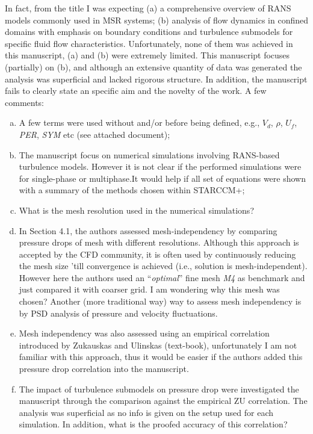 \documentclass[14pt,twoside]{report}
\begin{document}
In fact, from the title I was expecting (a) a comprehensive overview of RANS models commonly used in MSR systems; (b) analysis of flow dynamics in confined domains with emphasis on boundary conditions and turbulence submodels for specific fluid flow characteristics. Unfortunately, none of them was achieved in this manuscript, (a) and (b) were extremely limited. This manuscript focuses (partially) on (b), and although an extensive quantity of data was generated the analysis was superficial and lacked rigorous structure. In addition, the manuscript fails to clearly state an specific aim and the novelty of the work. A few comments:
\begin{enumerate}[(a)] 
%
    \item A few terms were used without and/or before being defined, e.g., $V_{d}$, $\rho$, $U_{f}$, {\it PER}, {\it SYM} etc (see attached document);
    \item The manuscript focus on numerical simulations involving RANS-based turbulence models. However it is not clear if the performed simulations were for single-phase or multiphase.It would help if all set of equations were shown with a summary of the methods chosen within STARCCM+;
    \item What is the mesh resolution used in the numerical simulations? 
    \item In Section 4.1, the authors assessed mesh-independency by comparing pressure drops of mesh with different resolutions. Although this approach is accepted by the CFD community, it is often used by continuously reducing the mesh size 'till convergence is achieved (i.e., solution is mesh-independent). However here the authors used an ``{\it optimal}'' fine mesh {\it M4} as benchmark and just compared it with coarser grid. I am wondering why this mesh was chosen? Another (more traditional way) way to assess mesh independency is by PSD analysis of pressure and velocity fluctuations. 
    \item Mesh independency was also assessed using an empirical correlation introduced by Zukauskas and Ulinskas (text-book), unfortunately I am not familiar with this approach, thus it would be easier if the authors added this pressure drop correlation into the manuscript.
    \item The impact of turbulence submodels on pressure drop were investigated the manuscript through the comparison against the empirical ZU correlation. The analysis was superficial as no info is given on the setup used for each simulation. In addition, what is the proofed accuracy of this correlation? 
\end{enumerate}
\end{document}
